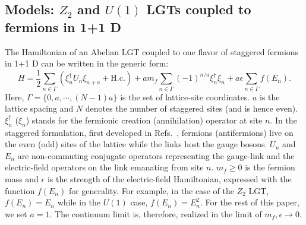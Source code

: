 \documentclass[a4paper,onecolumn,11pt,accepted=2024-10-11]{quantumarticle}
\begin{document}
\subsection{Models: $Z_2$ and $U(1)$ LGTs coupled to fermions in 1+1 D}
\label{sec:2-1}
The Hamiltonian of an Abelian LGT coupled to one flavor of staggered fermions in 1+1 D can be written in the generic form:
%
\begin{equation}
    H = \frac{1}{2} \sum_{n \in \Gamma}{\left( \xi_{n}^\dagger U_n \xi_{n+a} + \text{H.c.}\right)} + am_f\sum_{n \in \Gamma}{(-1)^{n/a}  \xi_{n}^\dagger\xi_n }+a\epsilon \sum_{n \in \Gamma}f(E_n).
    \label{eq:Abelian-H}
\end{equation}
%
Here, $\Gamma = \big \{0,a,\cdots,(N-1)a \big \}$ is the set of lattice-site coordinates. $a$ is the lattice spacing and $N$ denotes the number of staggered sites (and is hence even). $\xi^\dagger_n$ ($\xi_n$) stands for the fermionic creation (annihilation) operator at site $n$. In the staggered formulation, first developed in Refs.~\cite{Kogut:1974ag, Banks:1975gq}, fermions (antifermions) live on the even (odd) sites of the lattice while the links host the gauge bosons. $U_n$ and $E_n$ are non-commuting conjugate operators representing the gauge-link and the electric-field operators on the link emanating from site $n$. $m_f \geq 0 $ is the fermion mass and $\epsilon$ is the strength of the electric-field Hamiltonian, expressed with the function $f(E_n)$ for generality. For example, in the case of the $Z_2$ LGT, $f(E_n)=E_n$ while in the $U(1)$ case, $f(E_n)=E_n^2$. For the rest of this paper, we set $a=1$. The continuum limit is, therefore, realized in the limit of $m_f,\epsilon \to 0$.
\end{document}
